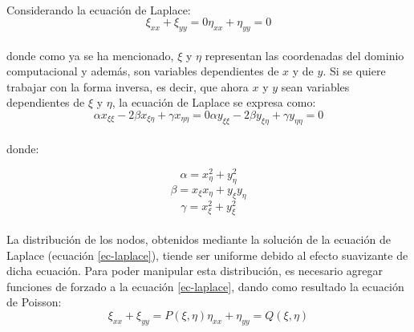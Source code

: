 \documentclass[letterpaper, openright, 12pt]{book}
\begin{document}
			\paragraph*{}
				Considerando la ecuación de Laplace:
				\begin{subequations}
					\begin{equation}
						\xi_{xx} + \xi_{yy} = 0
					\end{equation}
					\begin{equation}
						\eta_{xx} + \eta_{yy} = 0
					\end{equation}
					\label{ec-laplace}
				\end{subequations}\\
				donde como ya se ha mencionado, $\xi$ y $\eta$ representan las coordenadas del dominio computacional y además, son variables dependientes de $x$ y de $y$. Si se quiere trabajar con la forma inversa, es decir, que ahora $x$ y $y$ sean variables dependientes de $\xi$ y $\eta$, la ecuación  de Laplace se expresa como:
				\begin{subequations}
					\begin{equation}
						\alpha x_{\xi \xi} - 2\beta x_{\xi \eta} + \gamma x_{\eta \eta} = 0
					\end{equation}
					\begin{equation}
						\alpha y_{\xi \xi} - 2\beta y_{\xi \eta} + \gamma y_{\eta \eta} = 0
					\end{equation}
					\label{ec-laplace-invertida}
				\end{subequations}\\
				
				donde:
				
				\begin{equation*}
					\alpha = x_{\eta} ^ 2 + y_{\eta}^2
				\end{equation*}
				\begin{equation*}
					\beta = x_{\xi} x_{\eta} + y_{\xi} y_{\eta}
				\end{equation*}
				\begin{equation*}
					\gamma = x_{\xi} ^ 2 + y_{\xi} ^ 2
				\end{equation*}
			
			\paragraph*{}
				La distribución de los nodos, obtenidos mediante la solución de la ecuación de Laplace (ecuación \ref{ec-laplace}),  tiende ser uniforme debido al efecto suavizante de dicha ecuación. Para poder manipular esta distribución, es necesario agregar funciones de forzado a la ecuación \ref{ec-laplace}, dando como resultado la ecuación de Poisson:
				\begin{subequations}
					\begin{equation}
						\xi_{xx} + \xi_{yy} = P(\xi, \eta)
					\end{equation}
					\begin{equation}
						\eta_{xx} + \eta_{yy} = Q(\xi, \eta)
					\end{equation}
					\label{ec-poisson}
				\end{subequations}
			
\end{document}
